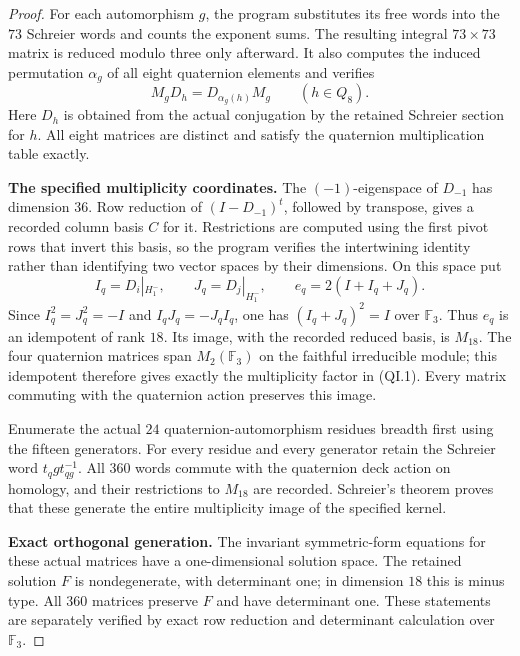 \begin{proof}
For each automorphism $g$, the program substitutes its
free words into the $73$ Schreier words and counts the
exponent sums.  The resulting integral $73\times73$
matrix is reduced modulo three only afterward.
It also computes the induced permutation $\alpha_g$
of all eight quaternion elements and verifies
\[
 M_gD_h=D_{\alpha_g(h)}M_g\qquad(h\in Q_8).             \tag{QI.5}
\]
Here $D_h$ is obtained from the actual conjugation by
the retained Schreier section for $h$.  All eight
matrices are distinct and satisfy the quaternion
multiplication table exactly.

\textbf{The specified multiplicity coordinates.}
The $(-1)$-eigenspace of $D_{-1}$ has dimension $36$.
Row reduction of $(I-D_{-1})^t$, followed by transpose,
gives a recorded column basis $C$ for it.  Restrictions
are computed using the first pivot rows that invert
this basis, so the program verifies the intertwining
identity rather than identifying two vector spaces by
their dimensions.  On this space put
\[
 I_q=D_i|_{H_1^-},\qquad J_q=D_j|_{H_1^-},\qquad
 e_q=2(I+I_q+J_q).
                                                        \tag{QI.6}
\]
Since $I_q^2=J_q^2=-I$ and $I_qJ_q=-J_qI_q$,
one has $(I_q+J_q)^2=I$ over $\mathbb F_3$.
Thus $e_q$ is an idempotent of rank $18$.  Its image,
with the recorded reduced basis, is $M_{18}$.
The four quaternion matrices span $M_2(\mathbb F_3)$
on the faithful irreducible module; this idempotent
therefore gives exactly the multiplicity factor in
(QI.1).  Every matrix commuting with the quaternion
action preserves this image.

Enumerate the actual $24$ quaternion-automorphism
residues breadth first using the fifteen generators.
For every residue and every generator retain the
Schreier word $t_qgt_{qg}^{-1}$.  All $360$ words
commute with the quaternion deck action on homology,
and their restrictions to $M_{18}$ are recorded.
Schreier's theorem proves that these generate the
entire multiplicity image of the specified kernel.

\textbf{Exact orthogonal generation.}
The invariant symmetric-form equations for these
actual matrices have a one-dimensional solution
space.  The retained solution $F$ is nondegenerate,
with determinant one; in dimension $18$ this is minus
type.  All $360$ matrices preserve $F$ and have
determinant one.  These statements are separately
verified by exact row reduction and determinant
calculation over $\mathbb F_3$.


\end{proof}
